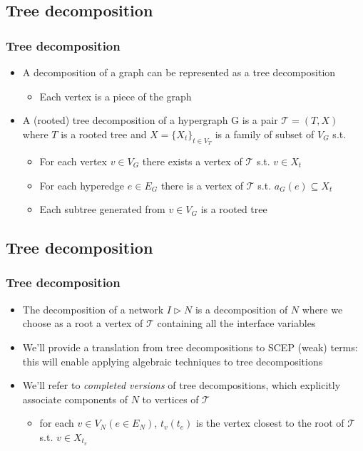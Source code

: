 \documentclass{beamer}
\begin{document}
\subsection{Tree decomposition}
\begin{frame}
\frametitle{Tree decomposition}
\begin{itemize}
	\item A decomposition of a graph can be represented as a tree decomposition
	\begin{itemize}
		\item Each vertex is a piece of the graph
	\end{itemize}
\medskip
	\item A (rooted) tree decomposition of a hypergraph G is a pair $\mathcal{T} = (T,X)$ where
	$T$ is a rooted tree and $X = \{ X_t\}_{t \in V_T}$ is a family of subset of $V_G$ s.t.
	\begin{itemize}
		\item For each vertex $v \in V_G$ there exists a vertex of $\mathcal{T}$ s.t.
		$v \in X_t$
		\item For each hyperedge $e \in E_G$ there is a vertex of $\mathcal{T}$ s.t. 
		$a_G(e) \subseteq X_t$
		\item Each subtree generated from $v \in V_G$ is a rooted tree
	\end{itemize}
\end{itemize}
\end{frame}

\subsection{Tree decomposition}
\begin{frame}
\frametitle{Tree decomposition}
\begin{itemize}
	\item The decomposition of a network $I \triangleright N$ is a decomposition of $N$ where we 
	choose as a root a vertex of $\mathcal{T}$ containing all the interface variables
\medskip
	\item We'll provide a translation from tree decompositions to SCEP (weak) terms: this will
	enable applying algebraic techniques to tree decompositions
\medskip
	\item We'll refer to \emph{completed versions} of tree decompositions, which explicitly
	associate components of $N$ to vertices of $\mathcal{T}$
	\begin{itemize}
		\item for each $v \in V_N (e \in E_N)$, $t_v (t_e)$ is the vertex closest to the root
		of $\mathcal{T}$ s.t. $v \in X_{t_v}$
	\end{itemize}
\end{itemize}
\end{frame}
\end{document}

